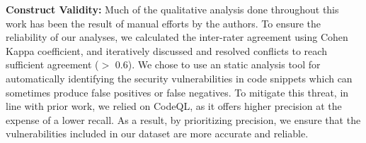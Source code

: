 \textbf{Construct Validity:} Much of the qualitative analysis done throughout this work has been the result of manual efforts by the authors. To ensure the reliability of our analyses, we %
calculated the inter-rater agreement using Cohen Kappa coefficient, and iteratively discussed and resolved conflicts to reach sufficient agreement ($>$ 0.6). 
We chose to use an static analysis tool for automatically identifying the security vulnerabilities in code snippets which can sometimes produce false positives or false negatives. To mitigate this threat, in line with prior work, we relied on CodeQL, as it offers higher precision at the expense of a lower recall. As a result, by prioritizing precision, we ensure that the vulnerabilities included in our dataset are more accurate and reliable.



